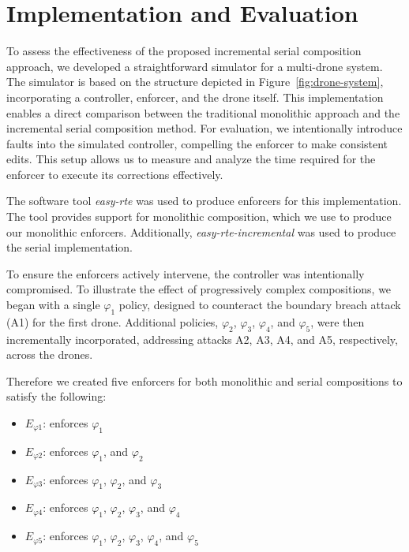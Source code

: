 
\chapter{Implementation and Evaluation}
\graphicspath{{Chapter_4/Vector/}{Chapter_4/}}

To assess the effectiveness of the proposed incremental serial composition approach, we developed a straightforward simulator for a multi-drone system. The simulator is based on the structure depicted in Figure~\ref{fig:drone-system}, incorporating a controller, enforcer, and the drone itself. This implementation enables a direct comparison between the traditional monolithic approach and the incremental serial composition method. For evaluation, we intentionally introduce faults into the simulated controller, compelling the enforcer to make consistent edits. This setup allows us to measure and analyze the time required for the enforcer to execute its corrections effectively.


The software tool \textit{easy-rte} \cite{8859335} was used to produce enforcers for this implementation. The tool provides support for monolithic composition, which we use to produce our monolithic enforcers. Additionally, \textit{easy-rte-incremental} \cite{10047915} was used to produce the serial implementation.

To ensure the enforcers actively intervene, the controller was intentionally compromised. To illustrate the effect of progressively complex compositions, we began with a single $\varphi_1$ policy, designed to counteract the boundary breach attack (A1) for the first drone. Additional policies, $\varphi_2$, $\varphi_3$, $\varphi_4$, and $\varphi_5$, were then incrementally incorporated, addressing attacks A2, A3, A4, and A5, respectively, across the drones.

Therefore we created five enforcers for both monolithic and serial compositions to satisfy the following:
\begin{itemize}
	\item[] $E_{\varphi1}$: enforces $\varphi_1$
	\item[] $E_{\varphi2}$: enforces $\varphi_1$, and $\varphi_2$
	\item[] $E_{\varphi3}$: enforces $\varphi_1 $, $ \varphi_2 $, and $\varphi_3$
	\item[]$E_{\varphi4}$: enforces $\varphi_1 $, $ \varphi_2 $, $ \varphi_3 $, and $ \varphi_4$
	\item[] $E_{\varphi5}$: enforces $\varphi_1 $, $ \varphi_2 $, $ \varphi_3 $, $ \varphi_4 $, and $ \varphi_{5}$ 
\end{itemize}

